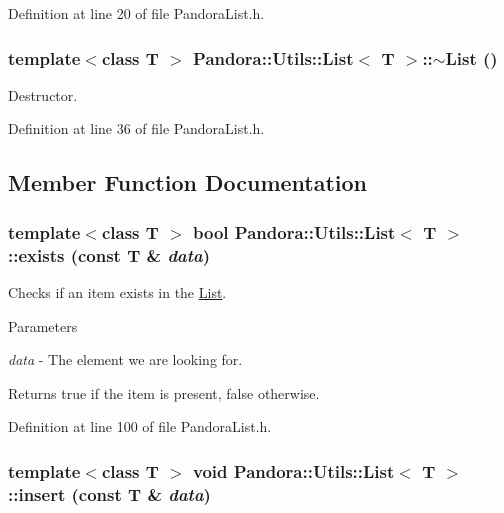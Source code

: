 Definition at line 20 of file PandoraList.h.\hypertarget{classPandora_1_1Utils_1_1List_a4014a2867a09df28421939d4732a7907}{
\subsubsection[{$\sim$List}]{\setlength{\rightskip}{0pt plus 5cm}template$<$class T $>$ {\bf Pandora::Utils::List}$<$ T $>$::$\sim${\bf List} ()}}
\label{classPandora_1_1Utils_1_1List_a4014a2867a09df28421939d4732a7907}


Destructor. 

Definition at line 36 of file PandoraList.h.

\subsection{Member Function Documentation}
\hypertarget{classPandora_1_1Utils_1_1List_ad15fe96a79420346c975e96eb23f35ea}{
\subsubsection[{exists}]{\setlength{\rightskip}{0pt plus 5cm}template$<$class T $>$ bool {\bf Pandora::Utils::List}$<$ T $>$::exists (const T \& {\em data})}}
\label{classPandora_1_1Utils_1_1List_ad15fe96a79420346c975e96eb23f35ea}


Checks if an item exists in the \hyperlink{classPandora_1_1Utils_1_1List}{List}. 
\begin{DoxyParams}{Parameters}
\item[{\em data}]-\/ The element we are looking for. \end{DoxyParams}
\begin{DoxyReturn}{Returns}
true if the item is present, false otherwise. 
\end{DoxyReturn}


Definition at line 100 of file PandoraList.h.\hypertarget{classPandora_1_1Utils_1_1List_a613c9a325c0e2916241acbd453d7b295}{
\subsubsection[{insert}]{\setlength{\rightskip}{0pt plus 5cm}template$<$class T $>$ void {\bf Pandora::Utils::List}$<$ T $>$::insert (const T \& {\em data})}}
\label{classPandora_1_1Utils_1_1List_a613c9a325c0e2916241acbd453d7b295}



